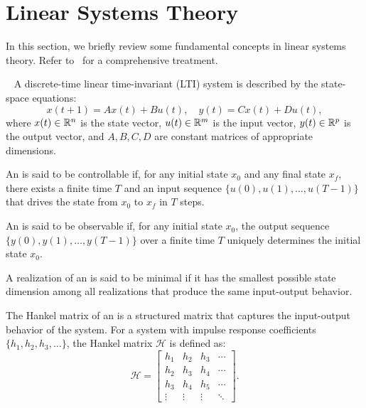 \section{Linear Systems Theory}
In this section, we briefly review some fundamental concepts in linear systems theory. Refer to~\cite{hespanha} for a comprehensive treatment.

\begin{definition}
~\label{def:lti}
    A discrete-time linear time-invariant (LTI) system is described by the state-space equations:
    \[
        x(t+1) = A x(t) + B u(t), \quad y(t) = C x(t) + D u(t),
    \]
    where $x(t) \in \mathbb{R}^n$ is the state vector, $u(t) \in \mathbb{R}^m$ is the input vector, $y(t) \in \mathbb{R}^p$ is the output vector, and $A, B, C, D$ are constant matrices of appropriate dimensions.
\end{definition}

\begin{definition}
[Controllability]
    An  is said to be controllable if, for any initial state $x_0$ and any final state $x_f$, there exists a finite time $T$ and an input sequence $\{u(0), u(1), \ldots, u(T-1)\}$ that drives the state from $x_0$ to $x_f$ in $T$ steps.
\end{definition}

\begin{definition}
[Observability]
    An  is said to be observable if, for any initial state $x_0$, the output sequence $\{y(0), y(1), \ldots, y(T-1)\}$ over a finite time $T$ uniquely determines the initial state $x_0$.
\end{definition}  

\begin{definition}
    A realization of an  is said to be minimal if it has the smallest possible state dimension among all realizations that produce the same input-output behavior.
\end{definition}

\begin{definition}
    The Hankel matrix of an  is a structured matrix that captures the input-output behavior of the system. For a system with impulse response coefficients $\{h_1, h_2, h_3, \ldots\}$, the Hankel matrix $\mathcal{H}$ is defined as:
    \[
        \mathcal{H} = \begin{bmatrix}
        h_1 & h_2 & h_3 & \cdots \\
        h_2 & h_3 & h_4 & \cdots \\
        h_3 & h_4 & h_5 & \cdots \\
        \vdots & \vdots & \vdots & \ddots
        \end{bmatrix}.
    \]
\end{definition}


